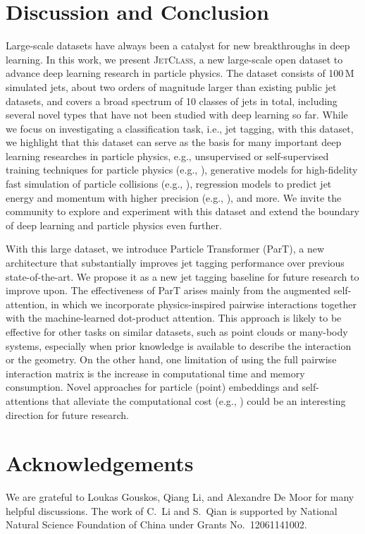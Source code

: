 \documentclass[nohyperref]{article}
\theoremstyle{plain}
\theoremstyle{definition}
\theoremstyle{remark}
\newcommand{\jetclass}{{\textsc{JetClass}}\xspace}
\begin{document}
\section{Discussion and Conclusion}
\label{sec:conclusion}

Large-scale datasets have always been a catalyst for new breakthroughs in deep learning. In this work, we present \jetclass, a new large-scale open dataset to advance deep learning research in particle physics. The dataset consists of 100\,M simulated jets, about two orders of magnitude larger than existing public jet datasets, and covers a broad spectrum of 10 classes of jets in total, including several novel types that have not been studied with deep learning so far. While we focus on investigating a classification task, i.e., jet tagging, with this dataset, we highlight that this dataset can serve as the basis for many important deep learning researches in particle physics, e.g., unsupervised or self-supervised training techniques for particle physics (e.g., \citet{Dillon:2021gag}), generative models for high-fidelity fast simulation of particle collisions (e.g., \citet{kansalParticleCloudGeneration2021}), regression models to predict jet energy and momentum with higher precision (e.g., \citet{CMS:2019uxx}), and more. We invite the community to explore and experiment with this dataset and extend the boundary of deep learning and particle physics even further.

With this large dataset, we introduce Particle Transformer (ParT), a new architecture that substantially improves jet tagging performance over previous state-of-the-art. We propose it as a new jet tagging baseline for future research to improve upon. The effectiveness of ParT arises mainly from the augmented self-attention, in which we incorporate physics-inspired pairwise interactions together with the machine-learned dot-product attention. This approach is likely to be effective for other tasks on similar datasets, such as point clouds or many-body systems, especially when prior knowledge is available to describe the interaction or the geometry. On the other hand, one limitation of using the full pairwise interaction matrix is the increase in computational time and memory consumption. Novel approaches for particle (point) embeddings and self-attentions that alleviate the computational cost (e.g., \citet{Informer,Kitaev2020Reformer}) could be an interesting direction for future research. 


\section*{Acknowledgements}

We are grateful to Loukas Gouskos, Qiang Li, and Alexandre De Moor for many helpful discussions. 
The work of C.~Li and S.~Qian is supported by National Natural Science Foundation of China under Grants No.~12061141002.

 
\end{document}
